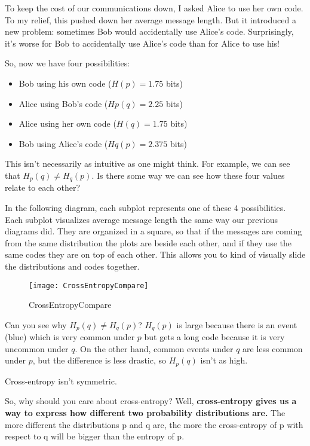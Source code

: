 To keep the cost of our communications down, I asked Alice to use her own code. To my relief, this pushed down her average message length.
But it introduced a new problem: sometimes Bob would accidentally use Alice's code.
Surprisingly, it's worse for Bob to accidentally use Alice's code than for Alice to use his!

So, now we have four possibilities:
\begin{itemize}
\item Bob using his own code ($H(p)=1.75$ bits)
\item Alice using Bob's code ($Hp(q)=2.25$ bits)
\item Alice using her own code ($H(q)=1.75$ bits)
\item Bob using Alice's code ($Hq(p)=2.375$ bits)
\end{itemize}

This isn't necessarily as intuitive as one might think. For example, we can see that $H_p(q) \neq H_q(p)$.
Is there some way we can see how these four values relate to each other?

In the following diagram, each subplot represents one of these 4 possibilities.
Each subplot visualizes average message length the same way our previous diagrams did.
They are organized in a square, so that if the messages are coming from the same distribution the plots are beside each other,
and if they use the same codes they are on top of each other. This allows you to kind of visually slide the distributions and codes together.

\begin{figure}[htbp]
  \centering
  \texttt{[image: CrossEntropyCompare]}\\
  \caption{CrossEntropyCompare}\label{fig.entropy.CrossEntropyCompare}
\end{figure}

Can you see why $H_p(q) \neq H_q(p)$?
$H_q(p)$ is large because there is an event (blue) which is very common under $p$ but gets a long code because it is very uncommon under $q$.
On the other hand, common events under $q$ are less common under $p$, but the difference is less drastic, so $H_p(q)$ isn't as high.

Cross-entropy isn't symmetric.

So, why should you care about cross-entropy? Well, \textbf{cross-entropy gives us a way to express how different two probability distributions are.}
The more different the distributions p and q are, the more the cross-entropy of p with respect to q will be bigger than the entropy of p.

